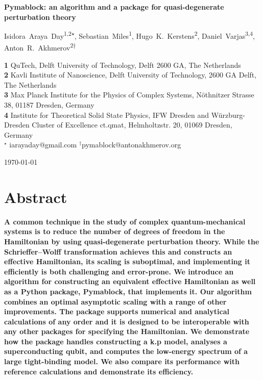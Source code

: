 \documentclass[submission, Codebases]{SciPost}
\begin{document}
\begin{center}
{\Large \textbf{Pymablock: an algorithm and a package for quasi-degenerate perturbation theory}}
\end{center}

\begin{center}
Isidora~Araya~Day\textsuperscript{1,2$\star$},
Sebastian~Miles\textsuperscript{1},
Hugo~K.~Kerstens\textsuperscript{2},
Daniel~Varjas\textsuperscript{3,4},
Anton~R.~Akhmerov\textsuperscript{2$\dagger$}
\end{center}

\begin{center}
\textbf{1} QuTech, Delft University of Technology, Delft 2600 GA, The Netherlands \\
\textbf{2} Kavli Institute of Nanoscience, Delft University of Technology, 2600 GA Delft, The Netherlands \\
\textbf{3} Max Planck Institute for the Physics of Complex Systems, Nöthnitzer Strasse 38, 01187 Dresden, Germany \\
\textbf{4} Institute for Theoretical Solid State Physics, IFW Dresden and W\"{u}rzburg-Dresden Cluster of Excellence ct.qmat, Helmholtzstr. 20, 01069 Dresden, Germany \\
${}^\star$ {\small \sf iarayaday@gmail.com}
${}^\dagger${\small \sf pymablock@antonakhmerov.org}
\end{center}

\begin{center}
    \today
\end{center}

\section*{Abstract}
\textbf{
A common technique in the study of complex quantum-mechanical systems is to reduce the number of degrees of freedom in the Hamiltonian by using quasi-degenerate perturbation theory.
While the Schrieffer--Wolff transformation achieves this and constructs an effective Hamiltonian, its scaling is suboptimal, and implementing it efficiently is both challenging and error-prone.
We introduce an algorithm for constructing an equivalent effective Hamiltonian as well as a Python package, Pymablock, that implements it.
Our algorithm combines an optimal asymptotic scaling with a range of other improvements.
The package supports numerical and analytical calculations of any order and it is designed to be interoperable with any other packages for specifying the Hamiltonian.
We demonstrate how the package handles constructing a k.p model, analyses a superconducting qubit, and computes the low-energy spectrum of a large tight-binding model.
We also compare its performance with reference calculations and demonstrate its efficiency.
}
\end{document}
